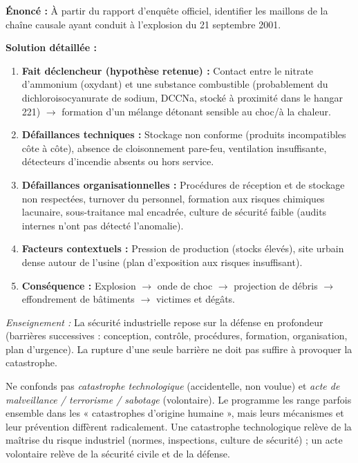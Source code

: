 \documentclass[11pt]{article}
\newcommand{\cle}[1]{{\popxbold\color{popdark}#1}}
\begin{document}
\begin{exoresolu}
\textbf{Énoncé :} À partir du rapport d'enquête officiel, identifier les maillons de la chaîne causale ayant conduit à l'explosion du 21 septembre 2001.

\textbf{Solution détaillée :}
\begin{enumerate}
    \item \textbf{Fait déclencheur (hypothèse retenue) :} Contact entre le nitrate d'ammonium (oxydant) et une substance combustible (probablement du dichloroisocyanurate de sodium, DCCNa, stocké à proximité dans le hangar 221) $\rightarrow$ formation d'un mélange détonant sensible au choc/à la chaleur.
    \item \textbf{Défaillances techniques :} Stockage non conforme (produits incompatibles côte à côte), absence de cloisonnement pare-feu, ventilation insuffisante, détecteurs d'incendie absents ou hors service.
    \item \textbf{Défaillances organisationnelles :} Procédures de réception et de stockage non respectées, turnover du personnel, formation aux risques chimiques lacunaire, sous-traitance mal encadrée, culture de sécurité faible (audits internes n'ont pas détecté l'anomalie).
    \item \textbf{Facteurs contextuels :} Pression de production (stocks élevés), site urbain dense autour de l'usine (plan d'exposition aux risques insuffisant).
    \item \textbf{Conséquence :} Explosion $\rightarrow$ onde de choc $\rightarrow$ projection de débris $\rightarrow$ effondrement de bâtiments $\rightarrow$ victimes et dégâts.
\end{enumerate}
\emph{Enseignement :} La sécurité industrielle repose sur la \cle{défense en profondeur} (barrières successives : conception, contrôle, procédures, formation, organisation, plan d'urgence). La rupture d'une seule barrière ne doit pas suffire à provoquer la catastrophe.
\end{exoresolu}

\begin{attention}
Ne confonds pas \emph{catastrophe technologique} (accidentelle, non voulue) et \emph{acte de malveillance / terrorisme / sabotage} (volontaire). Le programme les range parfois ensemble dans les « catastrophes d'origine humaine », mais leurs mécanismes et leur prévention diffèrent radicalement. Une catastrophe technologique relève de la \cle{maîtrise du risque industriel} (normes, inspections, culture de sécurité) ; un acte volontaire relève de la \cle{sécurité civile} et de la \cle{défense}.
\end{attention}
\end{document}
